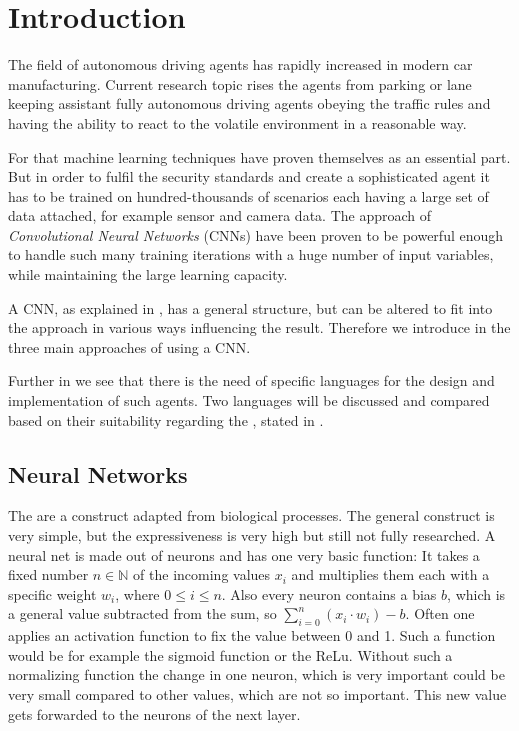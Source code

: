 \chapter{Introduction}

The field of autonomous driving agents has rapidly increased in modern car manufacturing. Current research topic rises the agents from parking or lane keeping assistant fully autonomous driving agents obeying the traffic rules and having the ability to react to the volatile environment in a reasonable way.

For that machine learning techniques have proven themselves as an essential part. But in order to fulfil the security standards and create a sophisticated agent it has to be trained on hundred-thousands of scenarios each having a large set of data attached, for example sensor and camera data.
The approach of \textit{Convolutional Neural Networks} (CNNs) have been proven to be powerful enough to handle such many training iterations with a huge number of input variables, while maintaining the large learning capacity. \cite{krizhevsky2012imagenet}

A CNN, as explained in , has a general structure, but can be altered to fit into the approach in various ways influencing the result. Therefore we introduce in  the three main approaches of using a CNN.

Further in  we see that there is the need of specific languages for the design and implementation of such agents. Two languages will be discussed and compared based on their suitability regarding the \alexnet, stated in  .

\section{Neural Networks}

The \nns are a construct adapted from biological processes. The general construct is very simple, but the expressiveness is very high but still not fully researched.
A neural net is made out of neurons and has one very basic function:
It takes a fixed number $n \in \mathbb{N}$ of the incoming values $x_i$ and multiplies them each with a specific weight $w_i$, where $0 \le i \le n$.
Also every neuron contains a bias $b$, which is a general value subtracted from the sum, so $\sum_{i=0}^{n} (x_i \cdot w_i) -b$. 
Often one applies an activation function to fix the value between 0 and 1. Such a function would be for example the sigmoid function or the ReLu. Without such a normalizing function the change in one neuron, which is very important could be very small compared to other values, which are not so important.
This new value gets forwarded to the neurons of the next layer.


